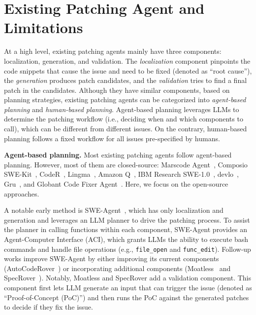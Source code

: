 \section{Existing Patching Agent and Limitations}
\label{sec:rw}

At a high level, existing patching agents mainly have three components: localization, generation, and validation. 
The \emph{localization} component pinpoints the code snippets that cause the issue and need to be fixed (denoted as ``root cause''), the \emph{generation} produces patch candidates, and the \emph{validation} 
tries to find a final patch in the candidates.
Although they have similar components, based on planning strategies, existing patching agents can be categorized into \emph{agent-based planning} and \emph{human-based planning}.
Agent-based planning leverages LLMs to determine the patching workflow (i.e., deciding when and which components to call), which can be different from different issues. 
On the contrary, human-based planning follows a fixed workflow for all issues pre-specified by humans.

\noindent\textbf{Agent-based planning.}
Most existing patching agents follow agent-based planning.
However, most of them are closed-source: Marscode Agent~\cite{liu2024marscode}, Composio SWE-Kit~\cite{Composio}, CodeR~\cite{CodeR}, Lingma~\cite{ma2024lingma}, Amazon Q~\cite{Amazon_Q}, IBM Research SWE-1.0~\cite{IBM_SWE1_0}, devlo~\cite{devlo}, Gru~\cite{gru}, and Globant Code Fixer Agent~\cite{Globant_Code_Fixer_Agent}.
Here, we focus on the open-source approaches.

A notable early method is SWE-Agent~\cite{yang2024swe}, which has only localization and generation and leverages an LLM planner to drive the patching process. 
To assist the planner in calling functions within each component, SWE-Agent provides an Agent-Computer Interface (ACI), which grants LLMs the ability to execute bash commands and handle file operations (e.g., \texttt{file\_open} and \texttt{func\_edit}).
Follow-up works improve SWE-Agent by either improving its current components (AutoCodeRover~\cite{zhang2024autocoderover}) or incorporating additional components (Moatless~\cite{moatless, antoniades2024swe} and SpecRover~\cite{ruan2024specrover}).
Notably, Moatless and SpecRover add a validation component.
This component first lets LLM generate an input that can trigger the issue (denoted as ``Proof-of-Concept (PoC)'') and then runs the PoC against the generated patches to decide if they fix the issue. 

